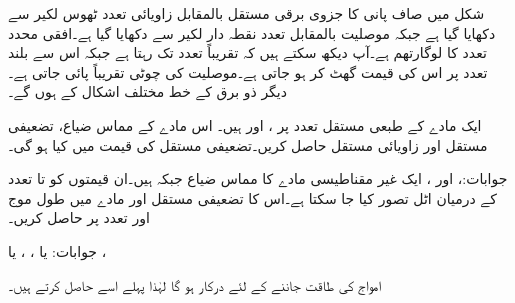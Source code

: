 شکل  میں صاف پانی کا جزوی برقی مستقل  بالمقابل زاویائی تعدد  ٹھوس لکیر سے دکھایا گیا ہے جبکہ موصلیت بالمقابل تعدد نقطہ دار لکیر سے دکھایا گیا ہے۔افقی محدد تعدد کا لوگارتھم  ہے۔آپ دیکھ سکتے ہیں کہ تقریباً  تعدد تک  رہتا ہے جبکہ اس سے بلند تعدد پر اس کی قیمت گھٹ کر  ہو جاتی ہے۔موصلیت کی چوٹی تقریباً  پائی جاتی ہے۔دیگر ذو برق کے خط مختلف اشکال کے ہوں گے۔

ایک مادے  کے طبعی مستقل  تعدد پر  ،  اور  ہیں۔ اس مادے کے مماس ضیاع، تضعیفی مستقل اور زاویائی مستقل حاصل کریں۔تضعیفی مستقل کی قیمت  میں کیا ہو گی۔

جوابات:،  اور ، 
ایک غیر مقناطیسی مادے کا مماس ضیاع  جبکہ  ہیں۔ان قیمتوں کو  تا  تعدد کے درمیان اٹل تصور کیا جا سکتا ہے۔اس کا تضعیفی مستقل اور  مادے میں طول موج   اور  تعدد پر حاصل کریں۔

جوابات: یا ، ،  یا ،  

امواج کی طاقت جاننے کے لئے    درکار ہو گا لہٰذا پہلے اسے حاصل کرتے ہیں۔

